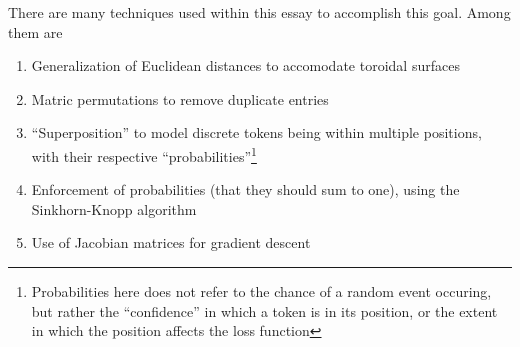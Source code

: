 There are many techniques used within this essay to accomplish this goal. Among them are
\begin{enumerate}
  \item Generalization of Euclidean distances to accomodate toroidal surfaces
  \item Matric permutations to remove duplicate entries
  \item ``Superposition'' to model discrete tokens being within multiple positions, with their respective ``probabilities''\footnote{Probabilities here does not refer to the chance of a random event occuring, but rather the ``confidence'' in which a token is in its position, or the extent in which the position affects the loss function}
  \item Enforcement of probabilities (that they should sum to one), using the Sinkhorn-Knopp algorithm\cite{sinkhorn1967concerning}
  \item Use of Jacobian matrices for gradient descent
\end{enumerate}
